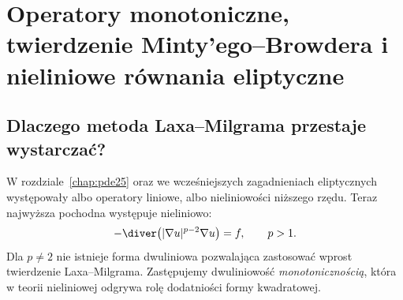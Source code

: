\chapter[Operatory monotoniczne i p-laplasjan]{Operatory monotoniczne, twierdzenie Minty'ego--Browdera i nieliniowe równania eliptyczne}
\label{chap:pde26}

\section{Dlaczego metoda Laxa--Milgrama przestaje wystarczać?}
W rozdziale~\ref{chap:pde25} oraz we wcześniejszych zagadnieniach
eliptycznych występowały albo operatory liniowe, albo nieliniowości
niższego rzędu. Teraz najwyższa pochodna występuje nieliniowo:
\begin{equation}\label{eq:pde26-main}
 -\diver\bigl(|\nabla u|^{p-2}\nabla u\bigr)=f,\qquad p>1.
\end{equation}
Dla $p\ne2$ nie istnieje forma dwuliniowa pozwalająca zastosować
wprost twierdzenie Laxa--Milgrama. Zastępujemy dwuliniowość
\emph{monotonicznością}, która w teorii nieliniowej odgrywa rolę
dodatniości formy kwadratowej.


